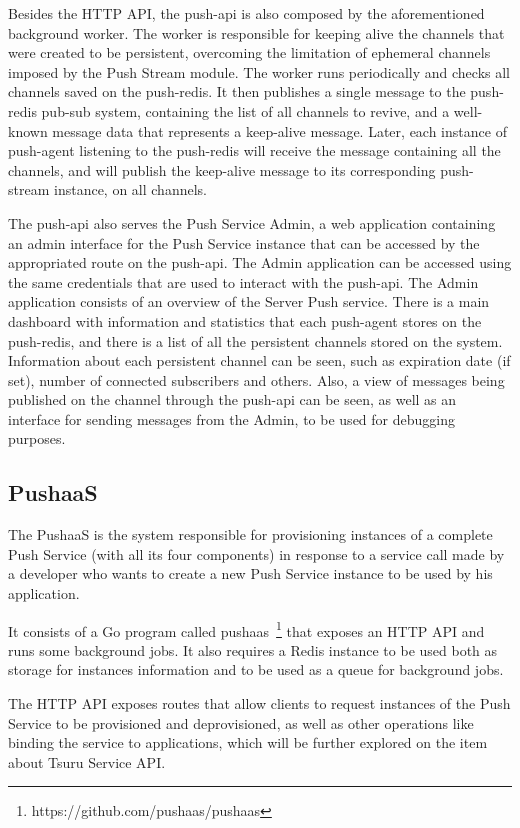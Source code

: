 Besides the HTTP API, the push-api is also composed by the aforementioned background worker. The worker is responsible for keeping alive the channels that were created to be persistent, overcoming the limitation of ephemeral channels imposed by the Push Stream module. The worker runs periodically and checks all channels saved on the push-redis. It then publishes a single message to the push-redis pub-sub system, containing the list of all channels to revive, and a well-known message data that represents a keep-alive message. Later, each instance of push-agent listening to the push-redis will receive the message containing all the channels, and will publish the keep-alive message to its corresponding push-stream instance, on all channels.

The push-api also serves the Push Service Admin, a web application containing an admin interface for the Push Service instance that can be accessed by the appropriated route on the push-api. The Admin application can be accessed using the same credentials that are used to interact with the push-api. The Admin application consists of an overview of the Server Push service. There is a main dashboard with information and statistics that each push-agent stores on the push-redis, and there is a list of all the persistent channels stored on the system. Information about each persistent channel can be seen, such as expiration date (if set), number of connected subscribers and others. Also, a view of messages being published on the channel through the push-api can be seen, as well as an interface for sending messages from the Admin, to be used for debugging purposes.


\subsection{PushaaS}

The PushaaS is the system responsible for provisioning instances of a complete Push Service (with all its four components) in response to a service call made by a developer who wants to create a new Push Service instance to be used by his application.

It consists of a Go program called pushaas~\footnote{https://github.com/pushaas/pushaas} that exposes an HTTP API and runs some background jobs. It also requires a Redis instance to be used both as storage for instances information and to be used as a queue for background jobs.

The HTTP API exposes routes that allow clients to request instances of the Push Service to be provisioned and deprovisioned, as well as other operations like binding the service to applications, which will be further explored on the item about Tsuru Service API.

